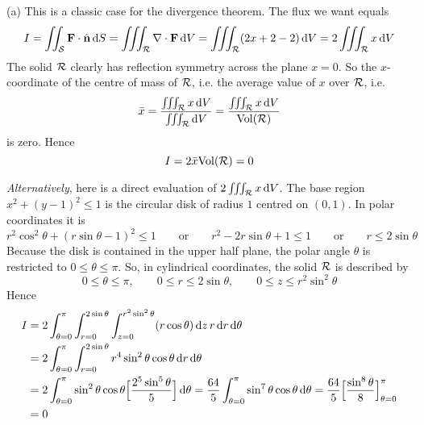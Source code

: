 \begin{solution} 
(a)
This is a classic case for the divergence theorem.
The flux we want equals
$$
I 
= \iint_{\mathcal{S}} \mathbf{F}\cdot \hat{\mathbf{n}}\,\mathrm{d}S
= \iiint_{\mathcal{R}} \nabla\cdot\mathbf{F}\,\mathrm{d}V
= \iiint_{\mathcal{R}} (2x + 2 - 2)\,\mathrm{d}V
= 2\iiint_{\mathcal{R}} x\,\mathrm{d}V
$$
The solid $\mathcal{R}$ clearly has reflection symmetry across the plane $x=0$.
So the $x$-coordinate of the centre of mass of $\mathcal{R}$, 
i.e. the average value of $x$ over $\mathcal{R}$,
i.e.
\begin{equation*}
\bar x =\frac{\iiint_{\mathcal{R}} x\,\mathrm{d}V}{\iiint_{\mathcal{R}}\mathrm{d}V}
=\frac{\iiint_{\mathcal{R}} x\,\mathrm{d}V}{{\rm Vol}(\mathcal{R})}
\end{equation*}
is zero. Hence 
\begin{equation*}
I=2\bar x{\rm Vol}(\mathcal{R})=0
\end{equation*}

\emph{Alternatively}, here is a direct evaluation of
$2\iiint_{\mathcal{R}} x\,\mathrm{d}V$. The base region $x^2 +(y-1)^2\le 1$ is 
the circular disk of radius $1$ centred on $(0,1)$. In polar coordinates
it is
\begin{equation*}
r^2\cos^2\theta +(r\sin\theta-1)^2\le 1\qquad\text{or}\qquad
r^2-2r\sin\theta +1 \le 1 \qquad\text{or}\qquad
r\le 2\sin\theta
\end{equation*}
Because the disk is contained in the upper half plane, the polar angle
$\theta$ is restricted to $0\le\theta\le \pi$. So,
in cylindrical coordinates, the solid $\mathcal{R}$ is described by
$$
0\le\theta\le\pi,\qquad
0\le r \le 2\sin\theta,\qquad
0\le z\le r^2\sin^2\theta
$$
Hence
\begin{align*}
I 
&= 2\int_{\theta=0}^\pi \int_{r=0}^{2\sin\theta} \int_{z=0}^{r^2\sin^2\theta}
(r\cos\theta)\,\mathrm{d}z\,r\,\mathrm{d}r\,\mathrm{d}\theta
\\
&= 2 \int_{\theta=0}^\pi \int_{r=0}^{2\sin\theta}
r^4\sin^2\theta\cos\theta\,\mathrm{d}r\,\mathrm{d}\theta
\\
&= 2 \int_{\theta=0}^\pi\sin^2\theta\cos\theta
           \Big[\frac{2^5\sin^5\theta}{ 5}\Big]\,\mathrm{d}\theta
= \frac{64}{5} \int_{\theta=0}^\pi \sin^7\theta\cos\theta\,\mathrm{d}\theta
= \frac{64}{5} \Big[\frac{\sin^8\theta}{8}\Big]_{\theta=0}^\pi \\
&= 0
\end{align*}


\end{solution}
